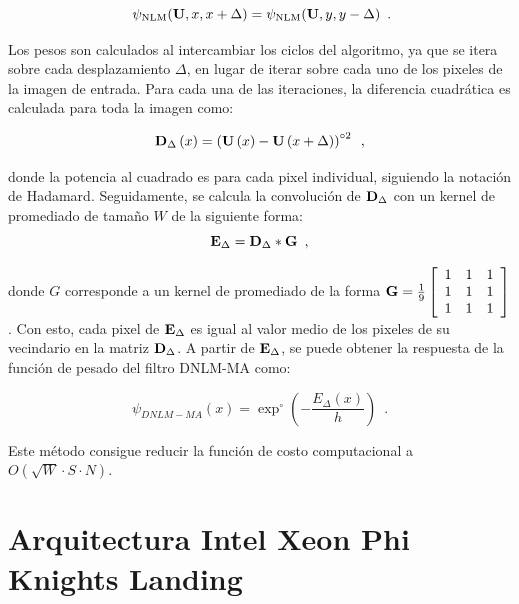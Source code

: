 \begin{equation}\
\psi_{\text{NLM}}(\mathbf{U}, x, x + \Delta) = \psi_{\text{NLM}}(\mathbf{U}, y, y - \Delta)  \enspace . 
\label{eq:symmetry}
\end{equation}

Los pesos son calculados al intercambiar los ciclos del algoritmo, ya que se itera sobre cada desplazamiento $\Delta$, en lugar de iterar sobre cada uno de los pixeles de la imagen de entrada. Para cada una de las iteraciones, la diferencia cuadrática es calculada para toda la imagen como:

\begin{equation}
\mathbf{D}_\Delta\left(x\right) = \left(\mathbf{U}\left(x\right) - \mathbf{U}\left( x + \Delta \right)\right)^{\circ2}  \enspace ,
\label{eq:diffquad}
\end{equation}

donde la potencia al cuadrado es para cada pixel individual, siguiendo la notación de Hadamard. Seguidamente, se calcula la convolución de
$\mathbf{D}_\Delta$ con un kernel de promediado de tama\~no $W$ de la siguiente forma:
\begin{equation}
\label{eq:convmoas}
\mathbf{E}_{\Delta} = \mathbf{D}_{\Delta} * \mathbf{G} \enspace ,
\end{equation}

donde $G$ corresponde a un kernel de promediado de la forma $\mathbf{G} = \frac{1}{9}\left[\begin{array}{ccc}
1 & 1 & 1\\
1 & 1 & 1\\
1 & 1 & 1
\end{array}\right]$. Con esto, cada pixel de $\mathbf{E}_{\Delta}$ es igual al valor medio de los pixeles de su vecindario en la matriz $\mathbf{D}_{\Delta}$. A partir de $\mathbf{E}_{\Delta}$, se puede obtener la respuesta de la función de pesado del filtro DNLM-MA como: 

\begin{equation}
\psi_{DNLM-MA}\left(x\right)=\exp^{\circ}\left(-\frac{ E_\Delta\left(x\right) }{h}\right)  \enspace .
\label{eq:wmoas}
\end{equation}


Este m\'etodo consigue reducir la  función de costo computacional a $O(\sqrt{W} \cdot S \cdot N)$.  



\section{Arquitectura Intel Xeon Phi Knights Landing}
\label{ch:marco_xeonphi}

